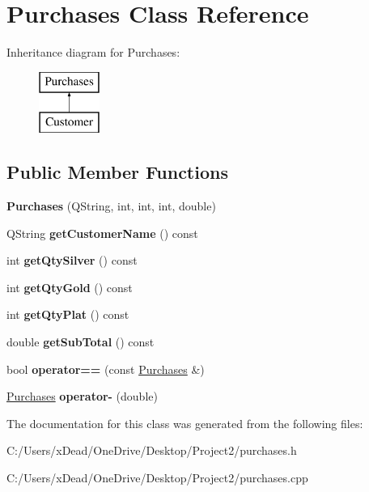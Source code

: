 \hypertarget{class_purchases}{}\section{Purchases Class Reference}
\label{class_purchases}
Inheritance diagram for Purchases\+:\begin{figure}[H]
\begin{center}
\leavevmode
\includegraphics[height=2.000000cm]{class_purchases}
\end{center}
\end{figure}
\subsection*{Public Member Functions}
\begin{DoxyCompactItemize}
\item 
\mbox{\label{class_purchases_ad44e2d8654199cec7d4fc2cbbc5f42a2}} 
{\bfseries Purchases} (Q\+String, int, int, int, double)
\item 
\mbox{\label{class_purchases_ae42dffed0e0d98b7dc055b17137de9e6}} 
Q\+String {\bfseries get\+Customer\+Name} () const
\item 
\mbox{\label{class_purchases_ae6cbc35e6008368d4fb0d936f2d55b22}} 
int {\bfseries get\+Qty\+Silver} () const
\item 
\mbox{\label{class_purchases_a73d8118537a82680f2d32baaf611c5e5}} 
int {\bfseries get\+Qty\+Gold} () const
\item 
\mbox{\label{class_purchases_a991e8a1000889b01ced9dd5f9b8d45ea}} 
int {\bfseries get\+Qty\+Plat} () const
\item 
\mbox{\label{class_purchases_a2d3bcf94fecdfd384559d1861c7fbafe}} 
double {\bfseries get\+Sub\+Total} () const
\item 
\mbox{\label{class_purchases_a92aabfb28dc5f836405295210ddcc55c}} 
bool {\bfseries operator==} (const \mbox{\hyperlink{class_purchases}{Purchases}} \&)
\item 
\mbox{\label{class_purchases_ada4bbbcc5530c402205f8c7eac1f3a6d}} 
\mbox{\hyperlink{class_purchases}{Purchases}} {\bfseries operator-\/} (double)
\end{DoxyCompactItemize}


The documentation for this class was generated from the following files\+:\begin{DoxyCompactItemize}
\item 
C\+:/\+Users/x\+Dead/\+One\+Drive/\+Desktop/\+Project2/purchases.\+h\item 
C\+:/\+Users/x\+Dead/\+One\+Drive/\+Desktop/\+Project2/purchases.\+cpp\end{DoxyCompactItemize}
